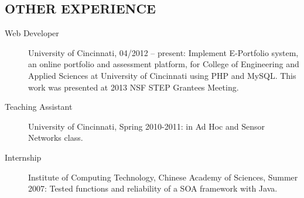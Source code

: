 \documentclass[line]{res}
\begin{document}
\begin{resume}
	\section{OTHER EXPERIENCE}
	\begin{description}
		\item[Web Developer] University of Cincinnati, 04/2012 – present: Implement E-Portfolio system, an online portfolio and assessment platform, for College of Engineering and Applied Sciences at University of Cincinnati using PHP and MySQL. This work was presented at 2013 NSF STEP Grantees Meeting.
		\item[Teaching Assistant] University of Cincinnati, Spring 2010-2011: in Ad Hoc and Sensor Networks class.
		\item[Internship] Institute of Computing Technology, Chinese Academy of Sciences, Summer 2007: Tested functions and reliability of a SOA framework with Java.
	\end{description}

\end{resume}
\end{document}

